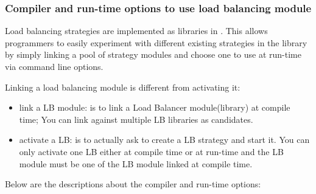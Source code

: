 \subsubsection{Compiler and run-time options to use load balancing module}
\label{lbOption}

Load balancing strategies are implemented as libraries in \charmpp{}. This
allows programmers to easily experiment with different existing strategies 
in the library by simply linking a pool of strategy modules and choose 
one to use at run-time via command line options.

Linking a load balancing module is different from activating it:
\begin{itemize}
\item link a LB module: is to link a Load Balancer module(library) at 
   compile time; You can link against multiple LB libraries as candidates.
\item activate a LB: is to actually ask to create a LB strategy and 
   start it. You can only activate one LB either at compile time or at
   run-time and the LB module must be one of the LB module linked at 
   compile time.
\end{itemize}


Below are the descriptions about the compiler and run-time options:

